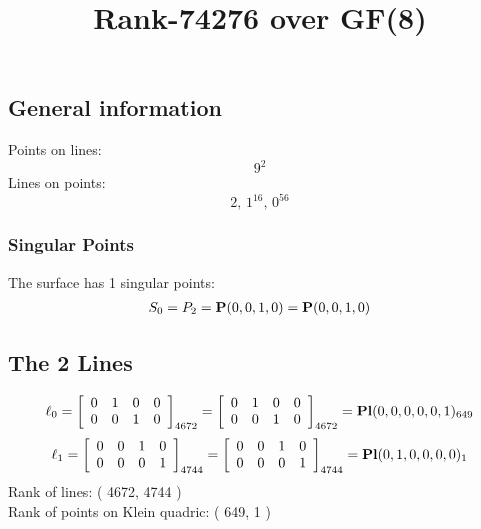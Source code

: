 \documentclass{article}
\newcommand\setTBstruts{\def\T{\rule{0pt}{2.6ex}}%
\def\B{\rule[-1.2ex]{0pt}{0pt}}}
\newcommand{\bP}{{\bf P}}
\begin{document}
 
\setTBstruts



{\allowdisplaybreaks%






\title{Rank-74276 over GF(8)}
\author{}%
\maketitle%
%
{}



\subsection*{General information}
Points on lines:
$$
9^2$$
Lines on points:
$$
2,\,1^{16},\,0^{56}$$
\subsubsection*{Singular Points}
The surface has 1 singular points:\\
\begin{align*}
S_{0} &= P_{2}=\bP(0, 0, 1, 0) = \bP(0, 0, 1, 0)\\
\end{align*}
\subsection*{The 2 Lines}
$$
\ell_{0} = 
\left[
\begin{array}{*{4}{r}}
0 & 1 & 0 & 0\\
0 & 0 & 1 & 0\\
\end{array}
\right]
_{4672}
=
\left[
\begin{array}{*{4}c}
0  & 1  & 0  & 0\\
0  & 0  & 1  & 0\\
\end{array}
\right]_{4672}
={\rm\bf Pl}(0,0,0,0,0,1 )_{649}$$
$$
\ell_{1} = 
\left[
\begin{array}{*{4}{r}}
0 & 0 & 1 & 0\\
0 & 0 & 0 & 1\\
\end{array}
\right]
_{4744}
=
\left[
\begin{array}{*{4}c}
0  & 0  & 1  & 0\\
0  & 0  & 0  & 1\\
\end{array}
\right]_{4744}
={\rm\bf Pl}(0,1,0,0,0,0 )_{1}$$
Rank of lines: ( 4672, 4744 )\\
Rank of points on Klein quadric: ( 649, 1 )\\
}
\end{document}
